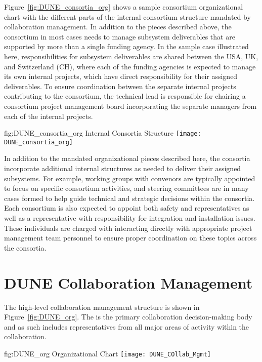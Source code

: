 Figure~\ref{fig:DUNE_consortia_org} shows a sample consortium organizational 
chart with the different parts of the internal consortium structure mandated 
by  collaboration management.  In addition to the pieces described 
above, the consortium in most cases needs to manage subsystem deliverables 
that are supported by more than a single funding agency.  In the sample case 
illustrated here, responsibilities for subsystem deliverables are shared 
between the USA, UK, and Switzerland (CH), where each of the 
funding agencies is expected to manage its own internal projects, which have
direct responsibility for their assigned deliverables.  To ensure coordination
between the separate internal projects contributing to the consortium, the 
technical lead is responsible for chairing a consortium project management 
board incorporating the separate managers from each of the internal projects.   
\begin{dunefigure}{fig:DUNE_consortia_org}
  { Internal Consortia Structure}
  \texttt{[image: DUNE\_consortia\_org]}
\end{dunefigure}

In addition to the mandated organizational pieces described here, the consortia 
incorporate additional internal structures as needed to deliver their assigned 
subsystems.  For example, working groups with convenors are typically appointed 
to focus on specific consortium activities, and steering committees are in many 
cases formed to help guide technical and strategic decisions within the consortia.
Each consortium is also expected to appoint both safety and  
representatives as well as a representative with responsibility for integration 
and installation issues.  These individuals are charged with interacting directly 
with appropriate project management team personnel to ensure proper coordination 
on these topics across the consortia.        

\section{DUNE Collaboration Management}
\label{sec:dune_mgmt}

The high-level  collaboration management structure is shown 
in Figure~\ref{fig:DUNE_org}.  The   is the primary
collaboration decision-making body and as such includes representatives 
from all major areas of activity within the collaboration.
\begin{dunefigure}{fig:DUNE_org}
  { Organizational Chart}
  \texttt{[image: DUNE\_COllab\_Mgmt]}
\end{dunefigure}

